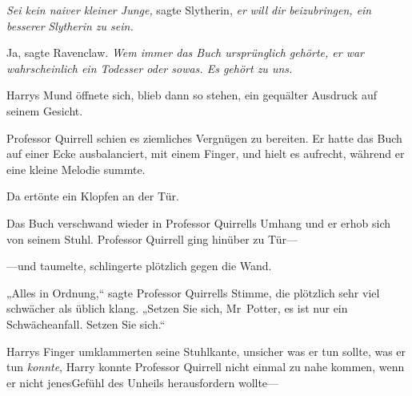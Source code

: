 \emph{Sei kein naiver kleiner Junge,} sagte Slytherin, \emph{er} \emph{will} \emph{dir beizubringen, ein} \emph{besserer} \emph{Slytherin zu sein.}

Ja, sagte Ravenclaw. \emph{Wem immer das Buch ursprünglich gehörte, er war wahrscheinlich ein Todesser oder sowas. Es gehört zu uns.}

Harrys Mund öffnete sich, blieb dann so stehen, ein gequälter Ausdruck auf seinem Gesicht.

Professor Quirrell schien es ziemliches Vergnügen zu bereiten. Er hatte das Buch auf einer Ecke ausbalanciert, mit einem Finger, und hielt es aufrecht, während er eine kleine Melodie summte.

Da ertönte ein Klopfen an der Tür.

Das Buch verschwand wieder in Professor Quirrells Umhang und er erhob sich von seinem Stuhl. Professor Quirrell ging hinüber zu Tür—

—und taumelte, schlingerte plötzlich gegen die Wand.

„Alles in Ordnung,“ sagte Professor Quirrells Stimme, die plötzlich sehr viel schwächer als üblich klang. „Setzen Sie sich, Mr~Potter, es ist nur ein Schwächeanfall. Setzen Sie sich.“

Harrys Finger umklammerten seine Stuhlkante, unsicher was er tun sollte, was er tun \emph{konnte}, Harry konnte Professor Quirrell nicht einmal zu nahe kommen, wenn er nicht jenesGefühl des Unheils herausfordern wollte—

